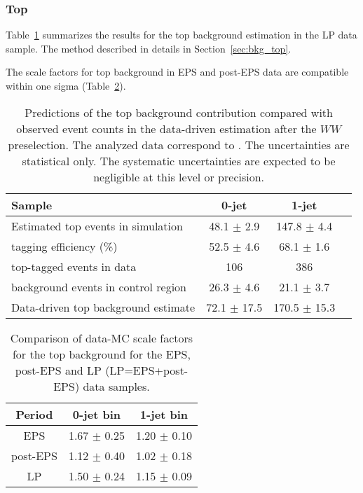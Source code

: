\subsubsection{Top}

Table~\ref{tab:lp_ttbar_est} summarizes the results for the top background estimation in the LP data sample. 
The method described in details in Section~\ref{sec:bkg_top}.

The scale factors for top background in EPS and post-EPS data are compatible within one sigma (Table~\ref{tab:lp_periods_top}).

\begin{table}[!htbp]
\begin{center}
\begin{tabular}{l c c c}
\hline
Sample                                        &   0-jet          & 1-jet          \\
\hline
Estimated top events in simulation  	      &  48.1 $\pm$ 2.9  & 147.8 $\pm$ 4.4 \\
tagging efficiency (\%)                       &  52.5 $\pm$ 4.6  &  68.1 $\pm$ 1.6 \\
top-tagged events in data           	      &          106     &    386          \\
background events in control region           &  26.3 $\pm$ 4.6  &  21.1 $\pm$ 3.7 \\
Data-driven top background estimate           &  72.1 $\pm$ 17.5 & 170.5 $\pm$ 15.3\\
\hline
\end{tabular}
\caption{Predictions of the top background contribution compared 
with observed event counts in the data-driven estimation after the $WW$ preselection. 
The analyzed data correspond to \lpintlumi.
The uncertainties are statistical only. The systematic uncertainties are expected to be 
negligible at this level or precision.}
\label{tab:lp_ttbar_est}
\end{center}
\end{table}

\begin{table}[!htbp]
\begin{center}
\begin{tabular}{c c c} 
\hline
Period & 0-jet bin & 1-jet bin \\ 
\hline
EPS      & 1.67 $\pm$ 0.25 & 1.20 $\pm$ 0.10 \\
post-EPS & 1.12 $\pm$ 0.40 & 1.02 $\pm$ 0.18 \\
LP       & 1.50 $\pm$ 0.24 & 1.15 $\pm$ 0.09 \\
\hline
\end{tabular}
\caption{Comparison of data-MC scale factors for the top background for the EPS, post-EPS and LP (LP=EPS+post-EPS) data samples.}
\label{tab:lp_periods_top}
\end{center}
\end{table}

